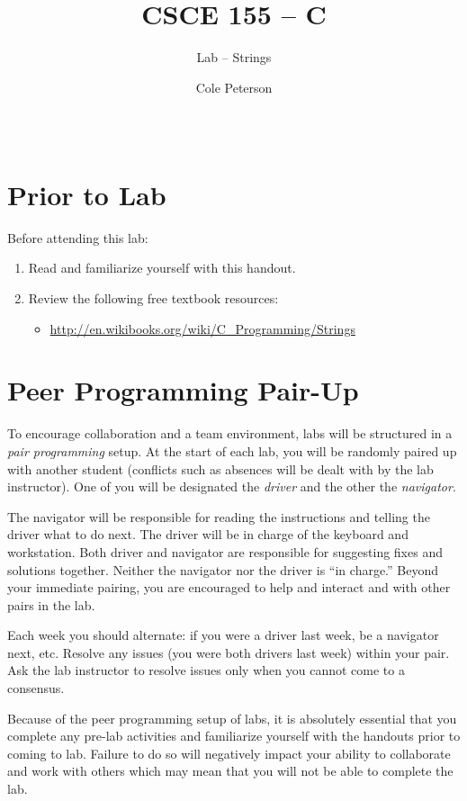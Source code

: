 \documentclass[12pt]{scrartcl}
\title{CSCE 155 -- C}
\subtitle{Lab -- Strings}
\author{Cole Peterson}
\date{~}
\begin{document}
\maketitle

\section*{Prior to Lab}

Before attending this lab:
\begin{enumerate}
  \item Read and familiarize yourself with this handout.
  \item Review the following free textbook resources:
	\begin{itemize}
  	  \item \url{http://en.wikibooks.org/wiki/C_Programming/Strings }
	\end{itemize}
\end{enumerate}

\section*{Peer Programming Pair-Up}

To encourage collaboration and a team environment, labs will be
structured in a \emph{pair programming} setup.  At the start of
each lab, you will be randomly paired up with another student 
(conflicts such as absences will be dealt with by the lab instructor).
One of you will be designated the \emph{driver} and the other
the \emph{navigator}.  

The navigator will be responsible for reading the instructions and
telling the driver what to do next.  The driver will be in charge of the
keyboard and workstation.  Both driver and navigator are responsible
for suggesting fixes and solutions together.  Neither the navigator
nor the driver is ``in charge.''  Beyond your immediate pairing, you
are encouraged to help and interact and with other pairs in the lab.

Each week you should alternate: if you were a driver last week, 
be a navigator next, etc.  Resolve any issues (you were both drivers
last week) within your pair.  Ask the lab instructor to resolve issues
only when you cannot come to a consensus.  

Because of the peer programming setup of labs, it is absolutely 
essential that you complete any pre-lab activities and familiarize
yourself with the handouts prior to coming to lab.  Failure to do
so will negatively impact your ability to collaborate and work with 
others which may mean that you will not be able to complete the
lab.  
\end{document}
